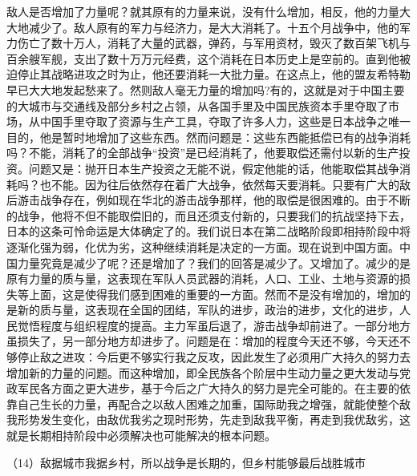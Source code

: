 \documentclass[UTF8, 12pt, a4paper]{ctexrep}
\begin{document}
敌人是否增加了力量呢？就其原有的力量来说，没有什么增加，相反，他的力量大大地减少了。敌人原有的军力与经济力，是大大消耗了。十五个月战争中，他的军力伤亡了数十万人，消耗了大量的武器，弹药，与军用资材，毁灭了数百架飞机与百余艘军舰，支出了数十万万元经费，这个消耗在日本历史上是空前的。直到他被迫停止其战略进攻之时为止，他还要消耗一大批力量。在这点上，他的盟友希特勒早已大大地发起愁来了。然则敌人毫无力量的增加吗?有的，这就是对于中国主要的大城市与交通线及部分乡村之占领，从各国手里及中国民族资本手里夺取了市场，从中国手里夺取了资源与生产工具，夺取了许多人力，这些是日本战争之唯一目的，他是暂时地增加了这些东西。然而问题是：这些东西能抵偿已有的战争消耗吗？不能，消耗了的全部战争“投资”是已经消耗了，他要取偿还需付以新的生产投资。问题又是：抛开日本生产投资之无能不说，假定他能的话，他能取偿其战争消耗吗？也不能。因为往后依然存在着广大战争，依然每天要消耗。只要有广大的敌后游击战争存在，例如现在华北的游击战争那样，他的取偿是很困难的。由于不断的战争，他将不但不能取偿旧的，而且还须支付新的，只要我们的抗战坚持下去，日本的这条可怜命运是大体确定了的。我们说日本在第二战略阶段即相持阶段中将逐渐化强为弱，化优为劣，这种继续消耗是决定的一方面。现在说到中国方面。中国力量究竟是减少了呢？还是增加了？我们的回答是减少了。又增加了。减少的是原有力量的质与量，这表现在军队人员武器的消耗，人口、工业、土地与资源的损失等上面，这是使得我们感到困难的重要的一方面。然而不是没有增加的，增加的是新的质与量，这表现在全国的团结，军队的进步，政治的进步，文化的进步，人民觉悟程度与组织程度的提高。主力军虽后退了，游击战争却前进了。一部分地方虽损失了，另一部分地方却进步了。问题是在：增加的程度今天还不够，今天还不够停止敌之进攻：今后更不够实行我之反攻，因此发生了必须用广大持久的努力去增加新的力量的问题。而这种增加，即全民族各个阶层中生动力量之更大发动与党政军民各方面之更大进步，基于今后之广大持久的努力是完全可能的。在主要的依靠自己生长的力量，再配合之以敌人困难之加重，国际助我之增强，就能使整个敌我形势发生变化，由敌优我劣之现时形势，先走到敌我平衡，再走到我优敌劣，这就是长期相持阶段中必须解决也可能解决的根本问题。

（14）敌据城市我据乡村，所以战争是长期的，但乡村能够最后战胜城市
\end{document}
